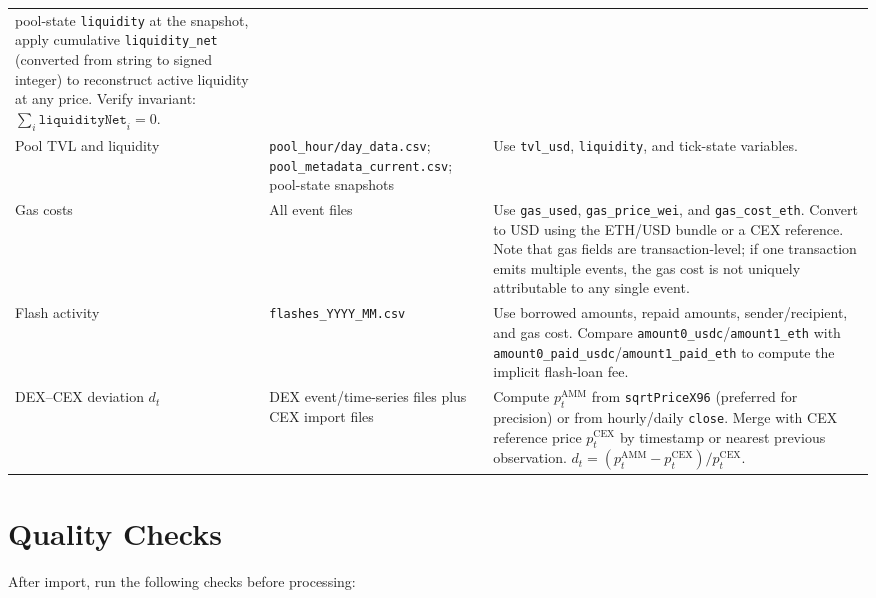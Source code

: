 \documentclass[11pt,a4paper]{article}
\begin{document}
\begin{xltabular}{\linewidth}{L{4.0cm}L{4.0cm}Y}
  pool-state \texttt{liquidity} at the snapshot, apply cumulative
  \texttt{liquidity\_net} (converted from string to signed integer) to
  reconstruct active liquidity at any price. Verify invariant:
  $\sum_i \texttt{liquidityNet}_i = 0$. \\
Pool TVL and liquidity &
  \texttt{pool\_hour/day\_data.csv};
  \texttt{pool\_metadata\_current.csv};
  pool-state snapshots &
  Use \texttt{tvl\_usd}, \texttt{liquidity}, and tick-state variables. \\
Gas costs &
  All event files &
  Use \texttt{gas\_used}, \texttt{gas\_price\_wei}, and
  \texttt{gas\_cost\_eth}. Convert to USD using the ETH/USD bundle or a
  CEX reference. Note that gas fields are transaction-level; if one
  transaction emits multiple events, the gas cost is not uniquely
  attributable to any single event. \\
Flash activity &
  \texttt{flashes\_YYYY\_MM.csv} &
  Use borrowed amounts, repaid amounts, sender/recipient, and gas cost.
  Compare \texttt{amount0\_usdc}/\texttt{amount1\_eth} with
  \texttt{amount0\_paid\_usdc}/\texttt{amount1\_paid\_eth} to compute the
  implicit flash-loan fee. \\
DEX--CEX deviation $d_t$ &
  DEX event/time-series files plus CEX import files &
  Compute $p_t^{\mathrm{AMM}}$ from \texttt{sqrtPriceX96} (preferred for
  precision) or from hourly/daily \texttt{close}. Merge with CEX reference
  price $p_t^{\mathrm{CEX}}$ by timestamp or nearest previous observation.
  $d_t = (p_t^{\mathrm{AMM}} - p_t^{\mathrm{CEX}}) / p_t^{\mathrm{CEX}}$.
  \\
\bottomrule
\end{xltabular}

\section{Quality Checks}
\label{sec:qc}

After import, run the following checks before processing:
\end{document}
